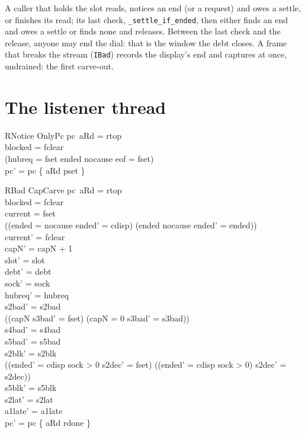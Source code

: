 \documentclass[a4paper,10pt,fleqn]{article}
\begin{document}
A caller that holds the slot reads, notices an end (or a request) and owes a
settle, or finishes its read; its last check, \texttt{\_settle\_if\_ended}, then
either finds an end and owes a settle or finds none and releases.  Between the
last check and the release, anyone may end the dial: that is the window the
debt closes.  A frame that breaks the stream (\texttt{IBad}) records the
display's end and captures at once, undrained: the first carve-out.

\section{The listener thread}

\begin{schema}{RNotice}
  OnlyPc
\where
  pc~aRd = rtop \\
  blocked = fclear \\
  (hubreq = fset \lor ended \neq nocause \lor eof = fset) \\
  pc' = pc \oplus \{ aRd \mapsto pset \}
\end{schema}

\begin{schema}{RBad}
  CapCarve
\where
  pc~aRd = rtop \\
  blocked = fclear \\
  current = fset \\
  ((ended = nocause \land ended' = cdisp) \lor (ended \neq nocause \land ended' = ended)) \\
  current' = fclear \\
  capN' = capN + 1 \\
  slot' = slot \\
  debt' = debt \\
  sock' = sock \\
  hubreq' = hubreq \\
  s2bad' = s2bad \\
  ((capN  \land s3bad' = fset) \lor (capN = 0 \land s3bad' = s3bad)) \\
  s4bad' = s4bad \\
  s5bad' = s5bad \\
  s2blk' = s2blk \\
  ((ended' = cdisp \land sock > 0 \land s2dec' = fset) \lor
    (\lnot (ended' = cdisp \land sock > 0) \land s2dec' = s2dec)) \\
  s5blk' = s5blk \\
  s2lat' = s2lat \\
  a1late' = a1late \\
  pc' = pc \oplus \{ aRd \mapsto rdone \}
\end{schema}
\end{document}

